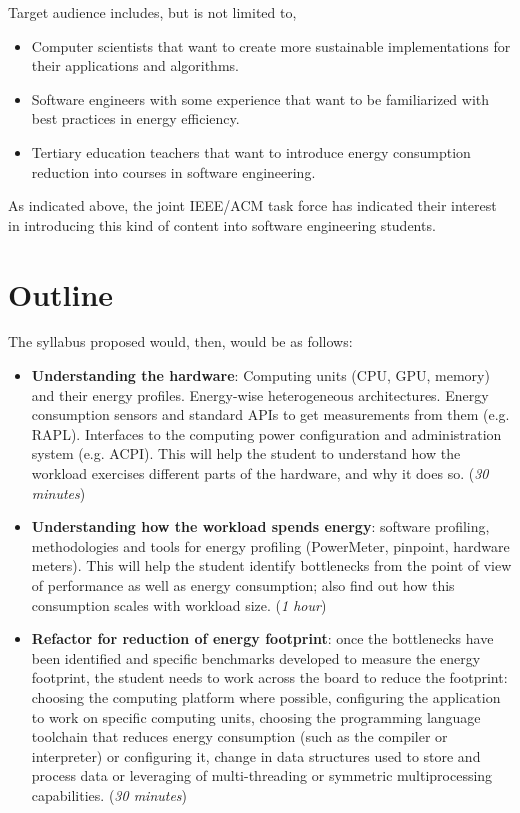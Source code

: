\documentclass[a4paper]{article}
\begin{document}
Target audience includes, but is not limited to, \begin{itemize}
  \item Computer scientists that want to create more sustainable implementations
    for their applications and algorithms.
  \item Software engineers with some experience that want to be familiarized
    with best practices in energy efficiency.
    \item Tertiary education teachers that want to introduce energy consumption
      reduction into courses in software engineering.
\end{itemize} 

As indicated above, the joint IEEE/ACM task force has indicated their interest
in introducing this kind of content into software engineering students.

\section{Outline}

 The syllabus proposed
would, then, would be as follows:\begin{itemize}
\item {\bf Understanding the hardware}: Computing units (CPU, GPU, memory) and their energy profiles. Energy-wise
  heterogeneous architectures. Energy consumption sensors and
  standard APIs to get measurements from them (e.g. RAPL). Interfaces to the
  computing power configuration and administration system (e.g. ACPI). This will
  help the student to understand how the workload exercises different parts of
  the hardware, and why it does so. ({\em 30 minutes})
\item {\bf Understanding how the workload spends energy}: software profiling,
  methodologies and tools for energy profiling (PowerMeter, {\sf pinpoint}, hardware meters). This will help the student identify
  bottlenecks from the point of view of performance as well as energy
  consumption; also find out how this consumption scales with workload
  size. ({\em 1 hour})
\item {\bf Refactor for reduction of energy footprint}: once the bottlenecks
  have been identified and specific benchmarks developed to measure the energy
  footprint, the student needs to work across the board to reduce the footprint:
  choosing the computing platform where possible, configuring the application to
  work on specific computing units, choosing the programming language toolchain
  that reduces energy consumption (such as the compiler or interpreter) or
  configuring it, change
  in data structures used to store and process data or leveraging of
  multi-threading or symmetric multiprocessing capabilities. ({\em 30 minutes})
\end{itemize}
\end{document}
